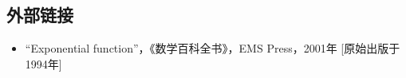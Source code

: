 \subsection{外部链接}
\begin{itemize}
\item  “Exponential function”，《数学百科全书》，EMS Press，2001年 [原始出版于1994年]
\end{itemize}
